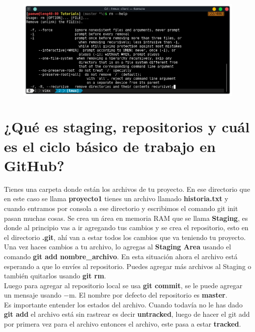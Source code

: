 \documentclass{article}
\begin{document}
\begin{figure}[h!]
  \centering
  \includegraphics[scale=0.75]{./Pictures/067_help.png}
\end{figure}



\newpage

\section{¿Qué es staging, repositorios y cuál es el ciclo básico de trabajo en GitHub?}%

Tienes una carpeta donde están los archivos de tu proyecto. En ese directorio
que en este caso se llama \textbf{proyecto1} tienes un archivo llamado
\textbf{historia.txt} y cuando entramos por consola a ese directorio y
escribimos el comando git init pasan muchas cosas. Se crea un área en memoria
RAM que se llama \textbf{Staging}, es donde al principio vas a ir agregando tus
cambios y se crea el repositorio, esto en el directorio \textbf{.git}, ahí van
a estar todos los cambios que va teniendo tu proyecto.\\

Una vez haces cambios a tu archivo, lo agregas al \textbf{Staging Area} usando
el comando \textbf{git add nombre\_archivo}. En esta situación ahora el archivo
está esperando a que lo envíes al repositorio. Puedes agregar más archivos al
Staging o también quitarlos usando \textbf{git rm}.\\

Luego para agregar al repositorio local se usa \textbf{git commit}, se le puede
agregar un mensaje usando $-$m. El nombre por defecto del repositorio es
\textbf{master}.\\

Es importante entender los estados del archivo. Cuando todavía no le has dado
\textbf{git add} el archivo está sin rastrear es decir \textbf{untracked},
luego de hacer el git add por primera vez para el archivo entonces el archivo,
este pasa a estar \textbf{tracked}.\\
\end{document}
